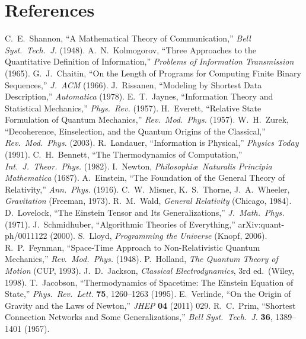 \documentclass[aps,preprint,onecolumn,longbibliography,nofootinbib]{revtex4-2}
\numberwithin{equation}{section}        %
\begin{document}
\section*{References}
\begin{thebibliography}{99}
 C.~E.~Shannon, ``A Mathematical Theory of Communication,'' \emph{Bell Syst.\ Tech.\ J.} (1948).
 A.~N.~Kolmogorov, ``Three Approaches to the Quantitative Definition of Information,'' \emph{Problems of Information Transmission} (1965).
 G.~J.~Chaitin, ``On the Length of Programs for Computing Finite Binary Sequences,'' \emph{J.\ ACM} (1966).
 J.~Rissanen, ``Modeling by Shortest Data Description,'' \emph{Automatica} (1978).
 E.~T.~Jaynes, ``Information Theory and Statistical Mechanics,'' \emph{Phys.\ Rev.} (1957).
 H.~Everett, ``Relative State Formulation of Quantum Mechanics,'' \emph{Rev.\ Mod.\ Phys.} (1957).
 W.~H.~Zurek, ``Decoherence, Einselection, and the Quantum Origins of the Classical,'' \emph{Rev.\ Mod.\ Phys.} (2003).
 R.~Landauer, ``Information is Physical,'' \emph{Physics Today} (1991).
 C.~H.~Bennett, ``The Thermodynamics of Computation,'' \emph{Int.\ J.\ Theor.\ Phys.} (1982).
 I.~Newton, \emph{Philosophi\ae\ Naturalis Principia Mathematica} (1687).
 A.~Einstein, ``The Foundation of the General Theory of Relativity,'' \emph{Ann.\ Phys.} (1916).
 C.~W.~Misner, K.~S.~Thorne, J.~A.~Wheeler, \emph{Gravitation} (Freeman, 1973).
 R.~M.~Wald, \emph{General Relativity} (Chicago, 1984).
 D.~Lovelock, ``The Einstein Tensor and Its Generalizations,'' \emph{J.\ Math.\ Phys.} (1971).
 J.~Schmidhuber, ``Algorithmic Theories of Everything,'' arXiv:quant-ph/0011122 (2000).
 S.~Lloyd, \emph{Programming the Universe} (Knopf, 2006).
 R.~P.~Feynman, ``Space-Time Approach to Non-Relativistic Quantum Mechanics,'' \emph{Rev.\ Mod.\ Phys.} (1948).
 P.~Holland, \emph{The Quantum Theory of Motion} (CUP, 1993).
 J.~D.~Jackson, \emph{Classical Electrodynamics}, 3rd ed.\ (Wiley, 1998).
 T.~Jacobson, ``Thermodynamics of Spacetime: The Einstein Equation of State,'' \emph{Phys.\ Rev.\ Lett.} \textbf{75}, 1260–1263 (1995).
 E.~Verlinde, ``On the Origin of Gravity and the Laws of Newton,'' \emph{JHEP} \textbf{04} (2011) 029.
 R.~C.~Prim, ``Shortest Connection Networks and Some Generalizations,'' \emph{Bell Syst.\ Tech.\ J.} \textbf{36}, 1389–1401 (1957).
\end{thebibliography}
\end{document}
